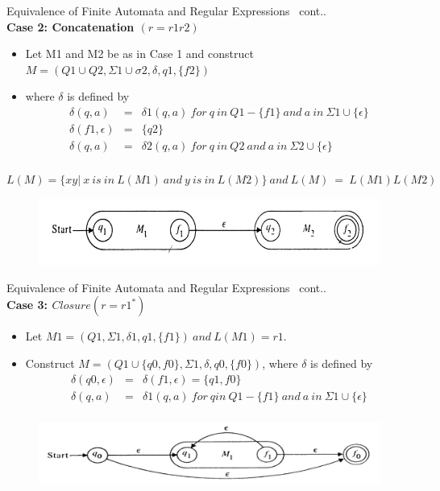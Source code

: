 \documentclass{beamer}
\begin{document}
\begin{frame}{Equivalence of Finite Automata and Regular Expressions}
	\proofname \ cont..\\ 

	\textbf{Case 2: Concatenation $(r = r1 r2)$}
	\begin{itemize}
		\item Let M1 and M2 be as in Case 1 and construct $M = (Q1 \cup Q2, \Sigma1 \cup \sigma2, \delta,	q1, \{f2\})$
		\item where $\delta$ is defined by
	\begin{eqnarray*}
\delta (q,a) &=& \delta1(q ,a)\  for\  q \ in\  Q1-\{f1\} \ and\  a\  in\  \Sigma1 \cup \{\epsilon \} \\
\delta (f1, \epsilon) &=& \{q2\} \\
\delta (q, a) &=& \delta2(q ,a)\  for\  q \ in\  Q2 \ and\  a\  in\  \Sigma2 \cup \{ \epsilon\} \\
	\end{eqnarray*}
	\end{itemize}
$L(M) =\{xy|\ x \  is\   in\  L(M1)\  and\  y\  is\  in\  L(M2)\}\  and\  L(M)\  =\  L(M1)L(M2)$
	\begin{figure}
	\includegraphics[scale=.5]{img2/m4}
\end{figure}
\end{frame}
\begin{frame}{Equivalence of Finite Automata and Regular Expressions}
	\proofname \ cont..\\ 
	
	\textbf{Case 3: $Closure (r = r1^*)$}
	\begin{itemize}
		\item Let $M1 = (Q1, \Sigma1, \delta1, q1, \{f1\}) \ and\  L(M1) = r1$.
		\item Construct $M = (Q1 \cup \{q0,f0\}, \Sigma1 , \delta, q0, \{f0\})$, where $\delta$ is defined by
		\begin{eqnarray*}
			\delta (q0, \epsilon) &=& \delta (f1, \epsilon) = \{q1,f0\}\\
		    \delta (q, a) &=& \delta1(q ,a)\  for\  q in \ Q1-\{f1\}\  and\  a\  in\  \Sigma1 \cup \{ \epsilon \}\\
		\end{eqnarray*}
	\end{itemize}
	\begin{figure}
		\includegraphics[scale=.5]{img2/m5}
	\end{figure}
\end{frame}
\end{document}
